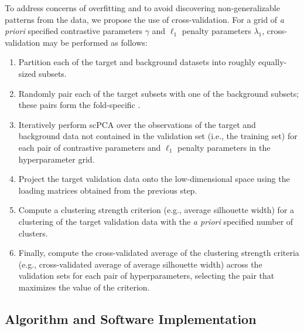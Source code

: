 To address concerns of overfitting and to avoid discovering non-generalizable patterns from the data, we propose the use of cross-validation. For a grid of \textit{a priori} specified contrastive parameters $\gamma$ and $\ell_1$ penalty parameters $\lambda_1$,  cross-validation may be performed as follows:
\begin{enumerate}
  \itemsep0pt
  \item Partition each of the target and     
     background datasets into  roughly
     equally-sized subsets.
   \item Randomly pair each of the target  subsets with one of the
     background subsets; these pairs form the fold-specific .
   \item Iteratively perform scPCA over the 
     observations of the target and
     background data not contained in the validation set (i.e., the training set)
     for each pair of contrastive parameters and $\ell_1$ penalty parameters in
     the hyperparameter grid.
  \item Project the target validation data onto the low-dimensional space using
     the loading matrices obtained from the previous step.
  \item Compute a clustering strength criterion (e.g., average
  silhouette width) for a clustering of the target validation data with the \textit{a priori}
  specified number of clusters.
  \item Finally, compute the cross-validated average of the clustering
  strength criteria (e.g., cross-validated average of average silhouette width)
  across the validation sets for each pair of hyperparameters, selecting the
  pair that maximizes the value of the criterion.
\end{enumerate}


\subsection{Algorithm and Software Implementation}


